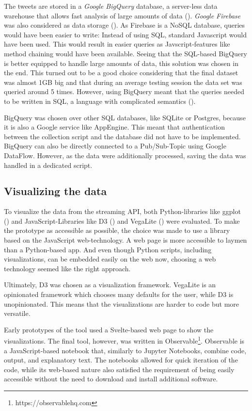The tweets are stored in a \emph{Google BigQuery} database, a server-less data warehouse that allows fast analysis of large amounts of data (\cite{google2020b}). \emph{Google Firebase} was also considered as data storage (\cite{google2020c}). As Firebase is a NoSQL database, queries would have been easier to write: Instead of using SQL, standard Javascript would have been used. This would result in easier queries as Javscript-features like method chaining would have been available. Seeing that the SQL-based BigQuery is better equipped to handle large amounts of data, this solution was chosen in the end. This turned out to be a good choice considering that the final dataset was almost 1GB big and that during an average testing session the data set was queried around 5 times. However, using BigQuery meant that the queries needed to be written in SQL, a language with complicated semantics (\cite{slutz1998massive}).

BigQuery was chosen over other SQL databases, like SQLite or Postgres, because it is also a Google service like AppEngine. This meant that authentication between the collection script and the database did not have to be implemented. BigQuery can also be directly connected to a Pub/Sub-Topic using Google DataFlow. However, as the data were additionally processed, saving the data was handled in a dedicated script. 

\subsection{Visualizing the data}
To visualize the data from the streaming API, both Python-libraries like ggplot (\cite{wickham2016}) and JavaScript-Libraries like D3 (\cite{bostock}) and VegaLite (\cite{uwidl}) were evaluated. To make the prototype as accessible as possible, the choice was made to use a library based on the JavaScript web-technology. A web page is more accessible to laymen than a Python-based app. And even though Python scripts, including visualizations, can be embedded easily on the web now, choosing a web technology seemed like the right approach.

Ultimately, D3 was chosen as a visualization framework. VegaLite is an opinionated framework which chooses many defaults for the user, while D3 is unopinionated. This means that the visualizations are harder to code but more versatile.

Early prototypes of the tool used a Svelte-based web page to show the visualizations. The final tool, however, was written in Observable\footnote{https://observablehq.com}. Observable is a JavaScript-based notebook that, similarly to Jupyter Notebooks, combine code, output, and explanatory text. The notebooks allowed for quick iteration of the code, while its web-based nature also satisfied the requirement of being easily accessible without the need to download and install additional software.


